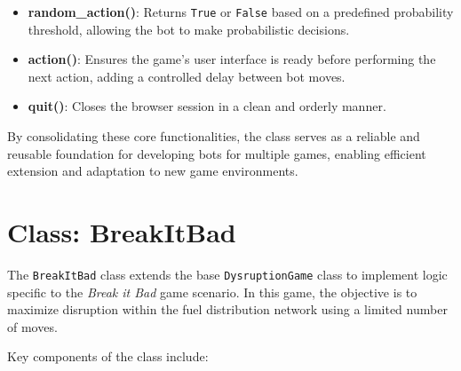 \documentclass[12pt,a4paper]{report}
\begin{document}
\begin{itemize}
            \item \textbf{random\_action()}: Returns \texttt{True} or \texttt{False} based on a predefined probability threshold, allowing the bot to make probabilistic decisions.
            
            \item \textbf{action()}: Ensures the game’s user interface is ready before performing the next action, adding a controlled delay between bot moves.
            
            \item \textbf{quit()}: Closes the browser session in a clean and orderly manner.
        \end{itemize}

        By consolidating these core functionalities, the class serves as a reliable and reusable foundation for developing bots for multiple games, enabling efficient extension and adaptation to new game environments.


    \section*{Class: BreakItBad}
    \label{subsec:class-breakitbad}

        The \texttt{BreakItBad} class extends the base \texttt{DysruptionGame} class to implement logic specific to the \textit{Break it Bad} game scenario. In this game, the objective is to maximize disruption within the fuel distribution network using a limited number of moves.

        Key components of the class include:
\end{document}
